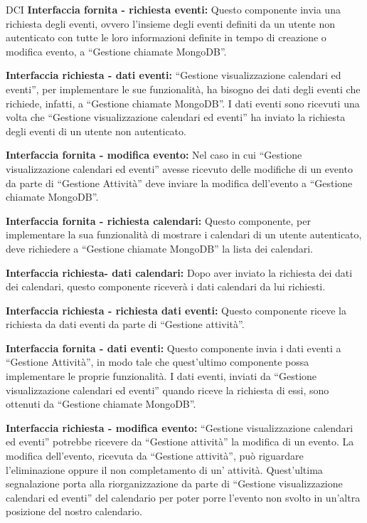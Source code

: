 \begin{listaPersonale}{DCI}
    \textbf{Interfaccia fornita - richiesta eventi:} Questo componente invia una richiesta degli eventi, ovvero l'insieme degli eventi definiti da un utente non autenticato con tutte le loro informazioni definite in tempo di creazione o modifica evento, a “Gestione chiamate MongoDB”.

    \textbf{Interfaccia richiesta - dati eventi:} “Gestione visualizzazione calendari ed eventi”, per implementare le sue funzionalità, ha bisogno dei dati degli eventi che richiede, infatti, a “Gestione chiamate MongoDB”. I dati eventi sono ricevuti una volta che “Gestione visualizzazione calendari ed eventi” ha inviato la richiesta degli eventi di un utente non autenticato.

    \textbf{Interfaccia fornita - modifica evento:} Nel caso in cui “Gestione visualizzazione calendari ed eventi” avesse ricevuto delle modifiche di un evento da parte di “Gestione Attività” deve inviare la modifica dell'evento a “Gestione chiamate MongoDB”.

    \textbf{Interfaccia fornita - richiesta calendari:} Questo componente, per implementare la sua funzionalità di mostrare i calendari di un utente autenticato, deve richiedere a “Gestione chiamate MongoDB” la lista dei calendari.

    \textbf{Interfaccia richiesta- dati calendari:} Dopo aver inviato la richiesta dei dati dei calendari, questo componente riceverà i dati calendari da lui richiesti.

    \textbf{Interfaccia richiesta - richiesta dati eventi:} Questo componente riceve la richiesta da dati eventi da parte di “Gestione attività”.

    \textbf{Interfaccia fornita - dati eventi:} Questo componente invia i dati eventi a “Gestione Attività”, in modo tale che quest'ultimo componente possa implementare le proprie funzionalità. I dati eventi, inviati da “Gestione visualizzazione calendari ed eventi” quando riceve la richiesta di essi, sono ottenuti da “Gestione chiamate MongoDB”.

    \textbf{Interfaccia richiesta - modifica evento:} “Gestione visualizzazione calendari ed eventi” potrebbe ricevere da “Gestione attività” la modifica di un evento. La modifica dell'evento, ricevuta da “Gestione attività”, può riguardare l'eliminazione oppure il non completamento di un' attività. Quest'ultima segnalazione porta alla riorganizzazione da parte di “Gestione visualizzazione calendari ed eventi” del calendario per poter porre l'evento non svolto in un'altra posizione del nostro calendario.


\end{listaPersonale}
